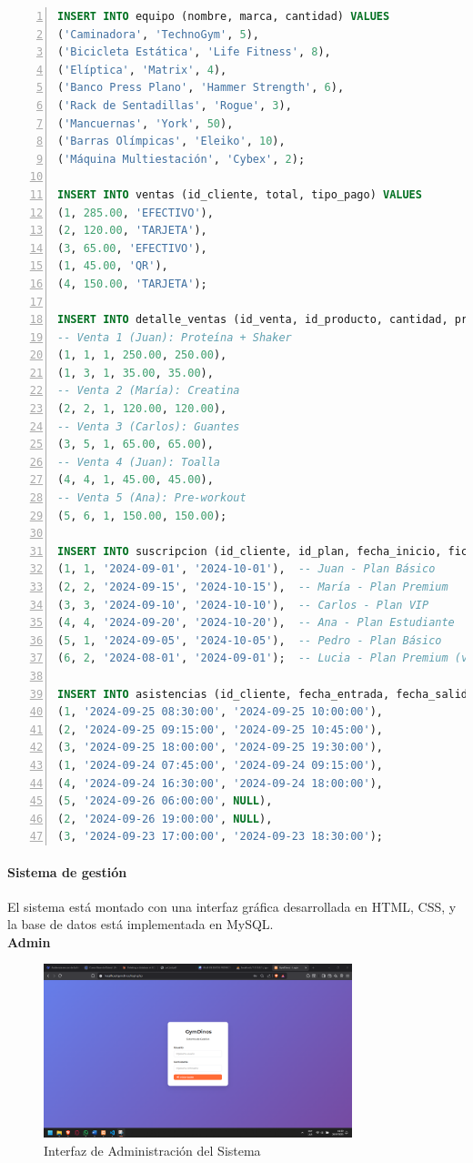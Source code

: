 \documentclass[12pt, letterpaper]{article}
\begin{document}
\begin{lstlisting}[language=SQL, numbers=left]
INSERT INTO equipo (nombre, marca, cantidad) VALUES
('Caminadora', 'TechnoGym', 5),
('Bicicleta Estática', 'Life Fitness', 8),
('Elíptica', 'Matrix', 4),
('Banco Press Plano', 'Hammer Strength', 6),
('Rack de Sentadillas', 'Rogue', 3),
('Mancuernas', 'York', 50),
('Barras Olímpicas', 'Eleiko', 10),
('Máquina Multiestación', 'Cybex', 2);

INSERT INTO ventas (id_cliente, total, tipo_pago) VALUES
(1, 285.00, 'EFECTIVO'),
(2, 120.00, 'TARJETA'),
(3, 65.00, 'EFECTIVO'),
(1, 45.00, 'QR'),
(4, 150.00, 'TARJETA');

INSERT INTO detalle_ventas (id_venta, id_producto, cantidad, precio_unitario, subtotal) VALUES
-- Venta 1 (Juan): Proteína + Shaker
(1, 1, 1, 250.00, 250.00),
(1, 3, 1, 35.00, 35.00),
-- Venta 2 (María): Creatina
(2, 2, 1, 120.00, 120.00),
-- Venta 3 (Carlos): Guantes
(3, 5, 1, 65.00, 65.00),
-- Venta 4 (Juan): Toalla
(4, 4, 1, 45.00, 45.00),
-- Venta 5 (Ana): Pre-workout
(5, 6, 1, 150.00, 150.00);

INSERT INTO suscripcion (id_cliente, id_plan, fecha_inicio, ficha_fin) VALUES
(1, 1, '2024-09-01', '2024-10-01'),  -- Juan - Plan Básico
(2, 2, '2024-09-15', '2024-10-15'),  -- María - Plan Premium  
(3, 3, '2024-09-10', '2024-10-10'),  -- Carlos - Plan VIP
(4, 4, '2024-09-20', '2024-10-20'),  -- Ana - Plan Estudiante
(5, 1, '2024-09-05', '2024-10-05'),  -- Pedro - Plan Básico
(6, 2, '2024-08-01', '2024-09-01');  -- Lucia - Plan Premium (vencido)

INSERT INTO asistencias (id_cliente, fecha_entrada, fecha_salida) VALUES
(1, '2024-09-25 08:30:00', '2024-09-25 10:00:00'),
(2, '2024-09-25 09:15:00', '2024-09-25 10:45:00'),
(3, '2024-09-25 18:00:00', '2024-09-25 19:30:00'),
(1, '2024-09-24 07:45:00', '2024-09-24 09:15:00'),
(4, '2024-09-24 16:30:00', '2024-09-24 18:00:00'),
(5, '2024-09-26 06:00:00', NULL),
(2, '2024-09-26 19:00:00', NULL),
(3, '2024-09-23 17:00:00', '2024-09-23 18:30:00');
\end{lstlisting}
\newpage

\paragraph{Sistema de gestión} 
El sistema está montado con una interfaz gráfica desarrollada en HTML, CSS, y la base de datos está implementada en MySQL.\\
\textbf{Admin}
\begin{figure}[ht]
\centering
\includegraphics[width=0.8\textwidth]{admin.png}
\caption{Interfaz de Administración del Sistema}
\label{fig:admin}
\end{figure}
\end{document}
